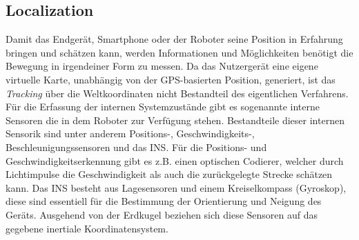 \subsection{Localization}
Damit das Endgerät, Smartphone oder der Roboter seine Position in Erfahrung bringen und schätzen kann, werden Informationen und Möglichkeiten 
benötigt die Bewegung in irgendeiner Form zu messen. Da das Nutzergerät eine eigene virtuelle Karte, unabhängig von der \acs{GPS}-basierten 
Position, generiert, ist das \textit{Tracking} über die Weltkoordinaten nicht Bestandteil des eigentlichen Verfahrens. Für die Erfassung der 
internen Systemzustände gibt es sogenannte interne Sensoren die in dem Roboter zur Verfügung stehen. Bestandteile dieser internen 
Sensorik sind unter anderem Positions-, Geschwindigkeits-, Beschleunigungssensoren und das \acl{INS}. Für die Positions- und 
Geschwindigkeitserkennung gibt es z.B. einen optischen Codierer, welcher durch Lichtimpulse die Geschwindigkeit als auch die zurückgelegte 
Strecke schätzen kann. Das \acs{INS} besteht aus Lagesensoren und einem Kreiselkompass (Gyroskop), diese sind essentiell für die Bestimmung 
der Orientierung und Neigung des Geräts. Ausgehend von der Erdkugel beziehen sich diese Sensoren auf das gegebene inertiale Koordinatensystem.
